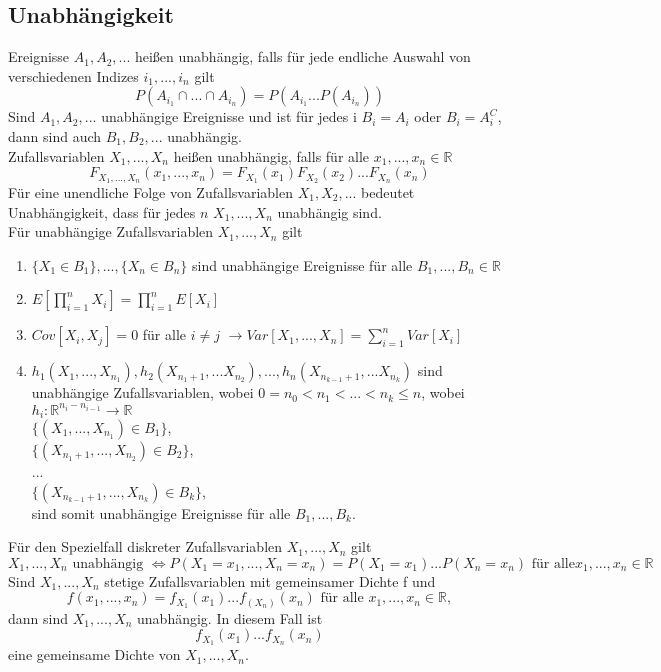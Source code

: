 \documentclass[a4paper,12pt]{article}
\begin{document}
\subsection{Unabhängigkeit}
Ereignisse $A_1, A_2, ...$ heißen unabhängig, falls für jede endliche Auswahl von verschiedenen Indizes $i_1, ..., i_n$ gilt
$$
	P(A_{i_1} \cap ... \cap A_{i_n}) = P(A_{i_1}...P(A_{i_n}))
$$
Sind $A_1, A_2, ...$ unabhängige Ereignisse und ist für jedes i $B_i = A_i$ oder $B_i = A_i^C$, dann sind auch $B_1, B_2, ...$ unabhängig.\\
Zufallsvariablen $X_1, ..., X_n$ heißen unabhängig, falls für alle $x_1, ..., x_n \in \mathbb{R}$
$$
	F_{X_1, ..., X_n}(x_1, ..., x_n) = F_{X_1}(x_1)F_{X_2}(x_2)...F_{X_n}(x_n)
$$
Für eine unendliche Folge von Zufallsvariablen $X_1, X_2, ...$ bedeutet Unabhängigkeit, dass für jedes $n$ $X_1, ..., X_n$ unabhängig sind.\\
Für unabhängige Zufallsvariablen $X_1, ..., X_n$ gilt
\begin{enumerate}
	\item $\{X_1 \in B_1\}, ..., \{ X_n \in B_n \}$ sind unabhängige Ereignisse für alle $B_1, ..., B_n \in \mathbb{R}$
	\item $E \left[\prod_{i=1  }^{n}X_i    \right] = \prod_{i=1}^{n}E[X_i]$
	\item $Cov[X_i,X_j] = 0$ für alle $i \neq j$ $\rightarrow Var[X_1, ..., X_n] = \sum_{i=1}^{n} Var[X_i]$
	\item $h_1(X_1, ..., X_{n_1}), h_2(X_{n_1+1}, ... X_{n_2}), ..., h_n(X_{n_{k-1}+1}, ... X_{n_k})$ sind unabhängige Zufallsvariablen, wobei $0 = n_0 < n_1 < ... < n_k \leq n$, wobei $h_i: \mathbb{R}^{n_i - n_{i-1}} \to \mathbb{R}$\\
	      $\{(X_1, ..., X_{n_1}) \in B_1     \}$, \\
	      $\{(X_{n_1+1}, ..., X_{n_2}) \in B_2     \}$, \\
	      ... \\
	      $\{(X_{n_{k-1}+1}, ..., X_{n_k}) \in B_k     \}$, \\
	      sind somit unabhängige Ereignisse für alle $B_1, ..., B_k$.
\end{enumerate}
Für den Spezielfall diskreter Zufallsvariablen $X_1, ..., X_n$ gilt
$$
	X_1, ..., X_n \text{ unabhängig } \Leftrightarrow P(X_1 =x_1, ..., X_n=x_n) = P(X_1=x_1)...P(X_n=x_n) \text{ für alle} x_1, ..., x_n \in \mathbb{R}
$$
Sind $X_1, ..., X_n$ stetige Zufallsvariablen mit gemeinsamer Dichte f und $$f(x_1, ..., x_n) = f_{X_1}(x_1)...f_(X_n)(x_n) \text{ für alle } x_1, ..., x_n \in \mathbb{R},$$
dann sind $X_1, ..., X_n$ unabhängig. In diesem Fall ist
$$
	f_{X_1}(x_1)...f_{X_n}(x_n)
$$
eine gemeinsame Dichte von $X_1, ..., X_n$.
\end{document}
